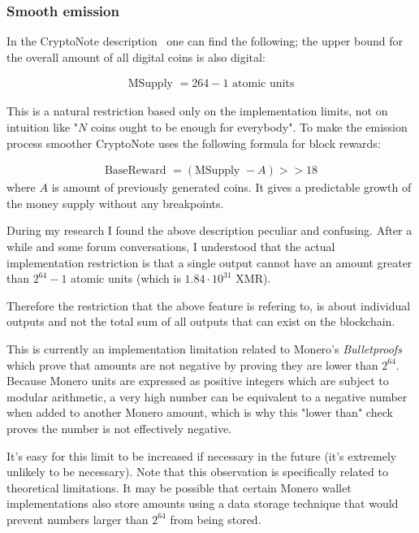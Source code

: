\subsubsection{Smooth emission}
In the CryptoNote description~\cite{cryptonote} one can find the following; the upper bound for the overall amount of all digital coins is also digital:

\begin{align*}
  \mbox{MSupply } = 264 − 1 \mbox{ atomic units}
\end{align*}

This is a natural restriction based only on the implementation limits, not on intuition like "$N$ coins ought to be enough for everybody". To make the emission process smoother CryptoNote uses the following formula for block rewards:

\begin{align*}
  \mbox{BaseReward } = (\mbox{MSupply } - A) >> 18
\end{align*}
where $A$ is amount of previously generated coins. It gives a predictable growth of the money supply without any breakpoints.

During my research I found the above description peculiar and confusing. After a while and some forum conversations, I understood that the actual implementation restriction is that a single output cannot have an amount greater than $2^{64} − 1$ atomic units (which is $1.84 \cdot 10^{31}$ XMR).

Therefore the restriction that the above feature is refering to, is about individual outputs and not the total sum of all outputs that can exist on the blockchain.

This is currently an implementation limitation related to Monero's \emph{Bulletproofs}~\cite{getmonero} which prove that amounts are not negative by proving they are lower than $2^{64}$. Because Monero units are expressed as positive integers which are subject to modular arithmetic, a very high number can be equivalent to a negative number when added to another Monero amount, which is why this "lower than" check proves the number is not effectively negative.

It's easy for this limit to be increased if necessary in the future (it's extremely unlikely to be necessary). Note that this observation is specifically related to theoretical limitations. It may be possible that certain Monero wallet implementations also store amounts using a data storage technique that would prevent numbers larger than $2^{64}$ from being stored.
